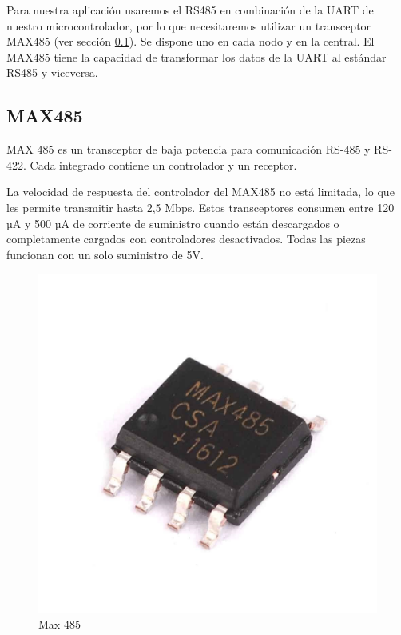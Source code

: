 Para nuestra aplicación usaremos el RS485 en combinación de la UART de nuestro microcontrolador, por lo que necesitaremos utilizar un transceptor MAX485 
(ver sección \ref{cap:max485}). Se dispone uno en cada nodo y en la central. El MAX485 tiene la capacidad de transformar los datos de la UART al estándar
RS485 y viceversa. \par

\subsection{MAX485} \label{cap:max485}

MAX 485 es un transceptor de baja potencia para comunicación RS-485 y RS-422. Cada integrado contiene un controlador y un receptor.\par 
La velocidad de respuesta del controlador del MAX485 no está limitada, lo que les permite transmitir hasta 2,5 Mbps. Estos transceptores
consumen entre 120 µA y 500 µA de corriente de suministro cuando están descargados o completamente cargados con controladores desactivados.
Todas las piezas funcionan con un solo suministro de 5V. 

\begin{figure}[htb]
	\centering
	\includegraphics[scale=0.5]{images/max485.jpg}
    \caption{Max 485}
	\label{fig:max485}
\end{figure}

